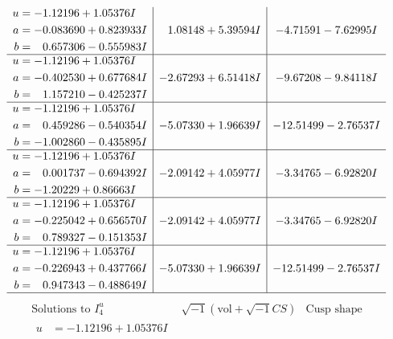 \documentclass[1p]{elsarticle_modified}
\theoremstyle{definition}
\newcommand{\I}{\sqrt{-1}}
\begin{document}
$$\begin{array}{c|c|c}
\begin{aligned}
u &= -1.12196 + 1.05376 I \\
a &= -0.083690 + 0.823933 I \\
b &= \phantom{-}0.657306 - 0.555983 I\end{aligned}
 & \phantom{-}1.08148 + 5.39594 I & -4.71591 - 7.62995 I \\ \hline\begin{aligned}
u &= -1.12196 + 1.05376 I \\
a &= -0.402530 + 0.677684 I \\
b &= \phantom{-}1.157210 - 0.425237 I\end{aligned}
 & -2.67293 + 6.51418 I & -9.67208 - 9.84118 I \\ \hline\begin{aligned}
u &= -1.12196 + 1.05376 I \\
a &= \phantom{-}0.459286 - 0.540354 I \\
b &= -1.002860 - 0.435895 I\end{aligned}
 & -5.07330 + 1.96639 I & -12.51499 - 2.76537 I \\ \hline\begin{aligned}
u &= -1.12196 + 1.05376 I \\
a &= \phantom{-}0.001737 - 0.694392 I \\
b &= -1.20229 + 0.86663 I\end{aligned}
 & -2.09142 + 4.05977 I & -3.34765 - 6.92820 I \\ \hline\begin{aligned}
u &= -1.12196 + 1.05376 I \\
a &= -0.225042 + 0.656570 I \\
b &= \phantom{-}0.789327 - 0.151353 I\end{aligned}
 & -2.09142 + 4.05977 I & -3.34765 - 6.92820 I \\ \hline\begin{aligned}
u &= -1.12196 + 1.05376 I \\
a &= -0.226943 + 0.437766 I \\
b &= \phantom{-}0.947343 - 0.488649 I\end{aligned}
 & -5.07330 + 1.96639 I & -12.51499 - 2.76537 I\\
 \hline 
 \end{array}$$\newpage$$\begin{array}{c|c|c}  
\text{Solutions to }I^u_{4}& \I (\text{vol} + \sqrt{-1}CS) & \text{Cusp shape}\\
 \hline 
\begin{aligned}
u &= -1.12196 + 1.05376 I \\

\end{aligned}
\end{array}$$
\end{document}
